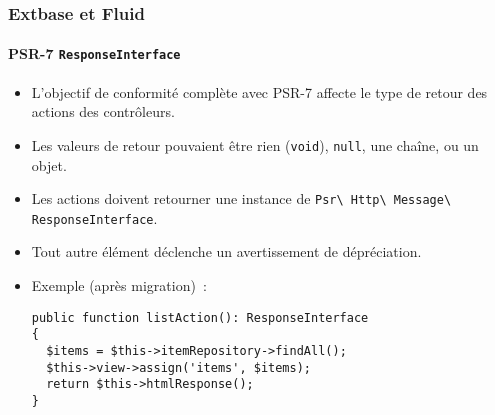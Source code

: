 %

\begin{frame}[fragile]
	\frametitle{Extbase et Fluid}
	\framesubtitle{PSR-7 \texttt{ResponseInterface}}


	\begin{itemize}
		\item L'objectif de conformité complète avec PSR-7 affecte le type de retour
			des actions des contrôleurs.
		\item Les valeurs de retour pouvaient être rien (\small\texttt{void}\normalsize),
			\small\texttt{null}\normalsize, une chaîne, ou un objet.
		\item Les actions doivent retourner une instance de
			\smaller\texttt{Psr\textbackslash
				Http\textbackslash
				Message\textbackslash
				ResponseInterface}.\normalsize
		\item Tout autre élément déclenche un avertissement de dépréciation.
		\item Exemple (après migration)~:
\begin{lstlisting}
public function listAction(): ResponseInterface
{
  $items = $this->itemRepository->findAll();
  $this->view->assign('items', $items);
  return $this->htmlResponse();
}
\end{lstlisting}

	\end{itemize}

\end{frame}

